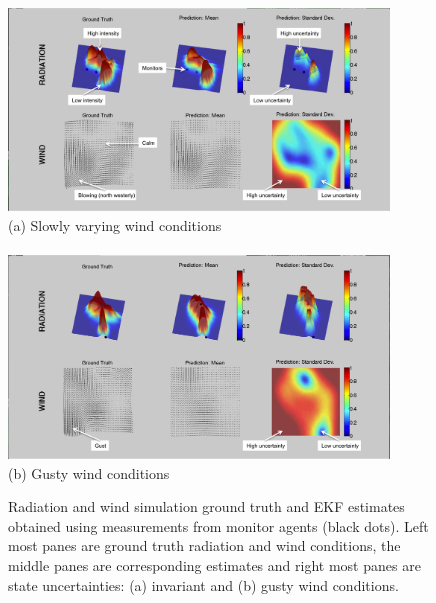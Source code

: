\begin{figure}[ht] \begin{center}
    \includegraphics[width=0.90\textwidth]{figures/radiation_ss_calm_annotated.png}\\
    (a) Slowly varying wind conditions\\ \ \\
    \includegraphics[width=0.90\textwidth]{figures/radiation_ss_gust_annotated.png}\\
    (b) Gusty wind conditions 
\caption{\label{radiation_screen_shots} Radiation and wind simulation ground truth and EKF estimates obtained using measurements from monitor agents (black dots).  Left most panes are ground truth radiation and wind conditions, the middle panes are corresponding estimates and right most panes are state uncertainties:  (a) invariant and (b) gusty wind conditions.}
\end{center}
\end{figure}

